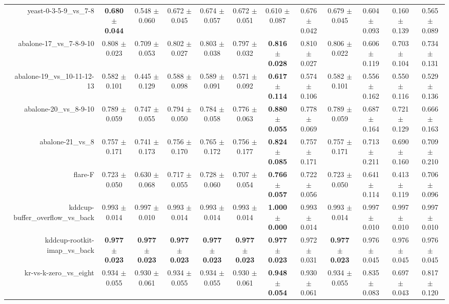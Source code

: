 \begin{table}[!ht]
{\begin{tabular}{r c c c c c c c c c c c}
yeast-0-3-5-9\_vs\_7-8 & \textbf{0.680 $\pm$ 0.044} & 0.548 $\pm$ 0.060 & 0.672 $\pm$ 0.045 & 0.674 $\pm$ 0.057 & 0.672 $\pm$ 0.051 & 0.610 $\pm$ 0.087 & 0.676 $\pm$ 0.042 & 0.679 $\pm$ 0.045 & 0.604 $\pm$ 0.093 & 0.160 $\pm$ 0.139 & 0.565 $\pm$ 0.089 \\
abalone-17\_vs\_7-8-9-10 & 0.808 $\pm$ 0.023 & 0.709 $\pm$ 0.053 & 0.802 $\pm$ 0.027 & 0.803 $\pm$ 0.038 & 0.797 $\pm$ 0.032 & \textbf{0.816 $\pm$ 0.028} & 0.810 $\pm$ 0.027 & 0.806 $\pm$ 0.022 & 0.606 $\pm$ 0.119 & 0.703 $\pm$ 0.104 & 0.734 $\pm$ 0.131 \\
abalone-19\_vs\_10-11-12-13 & 0.582 $\pm$ 0.101 & 0.445 $\pm$ 0.129 & 0.588 $\pm$ 0.098 & 0.589 $\pm$ 0.091 & 0.571 $\pm$ 0.092 & \textbf{0.617 $\pm$ 0.114} & 0.574 $\pm$ 0.106 & 0.582 $\pm$ 0.101 & 0.556 $\pm$ 0.162 & 0.550 $\pm$ 0.116 & 0.529 $\pm$ 0.136 \\
abalone-20\_vs\_8-9-10 & 0.789 $\pm$ 0.059 & 0.747 $\pm$ 0.055 & 0.794 $\pm$ 0.050 & 0.784 $\pm$ 0.058 & 0.776 $\pm$ 0.063 & \textbf{0.880 $\pm$ 0.055} & 0.778 $\pm$ 0.069 & 0.789 $\pm$ 0.059 & 0.687 $\pm$ 0.164 & 0.721 $\pm$ 0.129 & 0.666 $\pm$ 0.163 \\
abalone-21\_vs\_8 & 0.757 $\pm$ 0.171 & 0.741 $\pm$ 0.173 & 0.756 $\pm$ 0.170 & 0.765 $\pm$ 0.172 & 0.756 $\pm$ 0.177 & \textbf{0.824 $\pm$ 0.085} & 0.757 $\pm$ 0.171 & 0.757 $\pm$ 0.171 & 0.713 $\pm$ 0.211 & 0.690 $\pm$ 0.160 & 0.709 $\pm$ 0.210 \\
flare-F & 0.723 $\pm$ 0.050 & 0.630 $\pm$ 0.068 & 0.717 $\pm$ 0.055 & 0.728 $\pm$ 0.060 & 0.707 $\pm$ 0.054 & \textbf{0.766 $\pm$ 0.057} & 0.722 $\pm$ 0.056 & 0.723 $\pm$ 0.050 & 0.641 $\pm$ 0.114 & 0.413 $\pm$ 0.119 & 0.706 $\pm$ 0.096 \\
kddcup-buffer\_overflow\_vs\_back & 0.993 $\pm$ 0.014 & 0.997 $\pm$ 0.010 & 0.993 $\pm$ 0.014 & 0.993 $\pm$ 0.014 & 0.993 $\pm$ 0.014 & \textbf{1.000 $\pm$ 0.000} & 0.993 $\pm$ 0.014 & 0.993 $\pm$ 0.014 & 0.997 $\pm$ 0.010 & 0.997 $\pm$ 0.010 & 0.997 $\pm$ 0.010 \\
kddcup-rootkit-imap\_vs\_back & \textbf{0.977 $\pm$ 0.023} & \textbf{0.977 $\pm$ 0.023} & \textbf{0.977 $\pm$ 0.023} & \textbf{0.977 $\pm$ 0.023} & \textbf{0.977 $\pm$ 0.023} & \textbf{0.977 $\pm$ 0.023} & 0.972 $\pm$ 0.031 & \textbf{0.977 $\pm$ 0.023} & 0.976 $\pm$ 0.045 & 0.976 $\pm$ 0.045 & 0.976 $\pm$ 0.045 \\
kr-vs-k-zero\_vs\_eight & 0.934 $\pm$ 0.055 & 0.930 $\pm$ 0.061 & 0.934 $\pm$ 0.055 & 0.934 $\pm$ 0.055 & 0.930 $\pm$ 0.061 & \textbf{0.948 $\pm$ 0.054} & 0.930 $\pm$ 0.061 & 0.934 $\pm$ 0.055 & 0.835 $\pm$ 0.083 & 0.697 $\pm$ 0.043 & 0.817 $\pm$ 0.120 \\

\end{tabular}}
\end{table}
